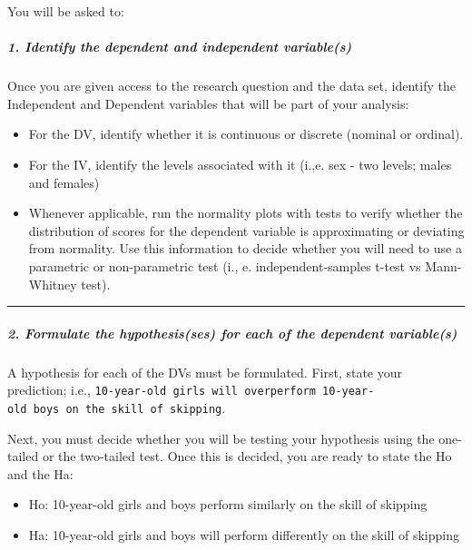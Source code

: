 \documentclass[11pt,]{article}
\providecommand{\tightlist}{%
  \setlength{\itemsep}{0pt}\setlength{\parskip}{0pt}}
\begin{document}
You will be asked to:

\hypertarget{identify-the-dependent-and-independent-variables}{%
\subparagraph{1. Identify the dependent and independent
variable(s)}\label{identify-the-dependent-and-independent-variables}}

Once you are given access to the research question and the data set,
identify the Independent and Dependent variables that will be part of
your analysis:

\begin{itemize}
\item
  For the DV, identify whether it is continuous or discrete (nominal or
  ordinal).
\item
  For the IV, identify the levels associated with it (i.,e. sex - two
  levels; males and females)
\item
  Whenever applicable, run the normality plots with tests to verify
  whether the distribution of scores for the dependent variable is
  approximating or deviating from normality. Use this information to
  decide whether you will need to use a parametric or non-parametric
  test (i., e. independent-samples t-test vs Mann-Whitney test).
\end{itemize}

\begin{center}\rule{0.5\linewidth}{0.5pt}\end{center}

\hypertarget{formulate-the-hypothesisses-for-each-of-the-dependent-variables}{%
\subparagraph{2. Formulate the hypothesis(ses) for each of the dependent
variable(s)}\label{formulate-the-hypothesisses-for-each-of-the-dependent-variables}}

A hypothesis for each of the DVs must be formulated. First, state your
prediction; i.e.,
\texttt{10-year-old\ girls\ will\ overperform\ 10-year-old\ boys\ on\ the\ skill\ of\ skipping}.

Next, you must decide whether you will be testing your hypothesis using
the one-tailed or the two-tailed test. Once this is decided, you are
ready to state the Ho and the Ha:

\begin{itemize}
\tightlist
\item
  Ho: 10-year-old girls and boys perform similarly on the skill of
  skipping
\item
  Ha: 10-year-old girls and boys will perform differently on the skill
  of skipping
\end{itemize}
\end{document}
